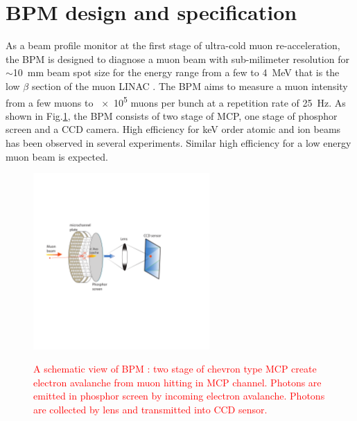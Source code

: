 \documentclass[preprint,3p,twocolumn]{elsarticle}
\begin{document}
\section{BPM design and specification}

As a beam profile monitor at the first stage of ultra-cold muon re-acceleration, the BPM is designed to diagnose a muon beam with %
sub-milimeter resolution for $\sim$\SI{10}{mm} beam spot size for the energy range from a few to \SI{4}{\MeV} that is the low $\beta$ section of the muon LINAC \cite{IH}.
The BPM aims to measure a muon intensity from a few muons to \num{e5} muons per bunch at a repetition rate of \SI{25}{\hertz}. %
As shown in Fig.\ref{fig:BPM_scheme}, the BPM consists of two stage of MCP, one stage of phosphor screen and a CCD camera.
High efficiency for \si{\keV} order atomic and ion beams has been observed in several experiments\cite{MCP_efficiency, MCP_efficiency1}. Similar high efficiency for a low energy muon beam is expected. 
\begin{figure}
\begin{center}
\vspace{-2.5cm}
\includegraphics[width=0.6\textwidth, height=0.6\textwidth]{figure/bpm_v3.pdf}
\vspace{-3cm}
\caption{\textcolor{red}{A schematic view of BPM : two stage of chevron type MCP create electron avalanche from muon hitting in MCP channel.
Photons are emitted in phosphor screen by incoming electron avalanche.
Photons are collected by lens and transmitted into CCD sensor.
}  
}
\vspace{-0.5cm}
\label{fig:BPM_scheme}
\end{center} \end{figure}
\end{document}
